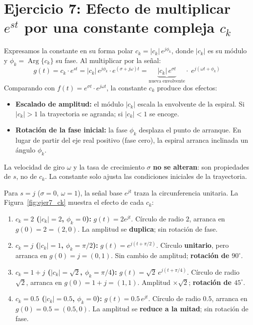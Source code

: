 \documentclass[10pt,a4paper]{article}
\begin{document}
\section*{Ejercicio 7: Efecto de multiplicar $e^{st}$ por una constante compleja $c_k$}

Expresamos la constante en su forma polar $c_k = |c_k|\,e^{j\phi_k}$, donde $|c_k|$ es su módulo y $\phi_k = \operatorname{Arg}\{c_k\}$ su fase. Al multiplicar por la señal:
\begin{equation*}
	g(t) = c_k\cdot e^{st}
	= |c_k|\,e^{j\phi_k}\cdot e^{(\sigma+j\omega)t}
	= \underbrace{|c_k|\,e^{\sigma t}}_{\text{nueva envolvente}}
	\cdot\; e^{j(\omega t + \phi_k)}
\end{equation*}
Comparando con $f(t) = e^{\sigma t}\cdot e^{j\omega t}$, la constante $c_k$ produce dos efectos:
\begin{itemize}
	\item \textbf{Escalado de amplitud:} el módulo $|c_k|$ escala la envolvente de la espiral. Si $|c_k|>1$ la trayectoria se agranda; si $|c_k|<1$ se encoge.
	\item \textbf{Rotación de la fase inicial:} la fase $\phi_k$ desplaza el punto de arranque. En lugar de partir del eje real positivo (fase cero), la espiral arranca inclinada un ángulo $\phi_k$.
\end{itemize}
La velocidad de giro $\omega$ y la tasa de crecimiento $\sigma$ \textbf{no se alteran}: son propiedades de $s$, no de $c_k$. La constante solo ajusta las condiciones iniciales de la trayectoria.

Para $s=j$ ($\sigma=0$, $\omega=1$), la señal base $e^{jt}$ traza la circunferencia unitaria. La Figura~\ref{fig:ejer7_ck} muestra el efecto de cada $c_k$:

\begin{enumerate}[label=\textbf{\alph*)}]
	\item \textbf{$c_k = 2$ \;($|c_k|=2$, $\phi_k=0$):}\quad
	$g(t)=2e^{jt}$. Círculo de radio $2$, arranca en $g(0)=2=(2,0)$. La amplitud se \textbf{duplica}; sin rotación de fase.

	\item \textbf{$c_k = j$ \;($|c_k|=1$, $\phi_k=\pi/2$):}\quad
	$g(t)=e^{j(t+\pi/2)}$. Círculo \textbf{unitario}, pero arranca en $g(0)=j=(0,1)$. Sin cambio de amplitud; \textbf{rotación de $90^\circ$}.

	\item \textbf{$c_k = 1+j$ \;($|c_k|=\sqrt{2}$, $\phi_k=\pi/4$):}\quad
	$g(t)=\sqrt{2}\,e^{j(t+\pi/4)}$. Círculo de radio $\sqrt{2}$, arranca en $g(0)=1+j=(1,1)$. Amplitud $\times\sqrt{2}$; \textbf{rotación de $45^\circ$}.

	\item \textbf{$c_k = 0.5$ \;($|c_k|=0.5$, $\phi_k=0$):}\quad
	$g(t)=0.5\,e^{jt}$. Círculo de radio $0.5$, arranca en $g(0)=0.5=(0.5,0)$. La amplitud se \textbf{reduce a la mitad}; sin rotación de fase.
\end{enumerate}
\end{document}
